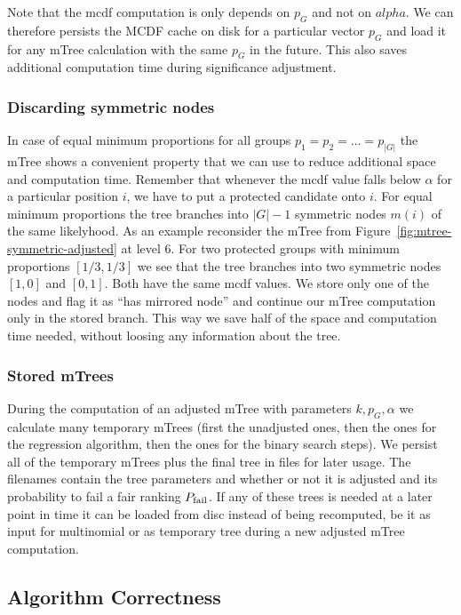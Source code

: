 Note that the mcdf computation is only depends on $p_G$ and not on $alpha$. 
%
We can therefore persists the MCDF cache on disk for a particular vector $p_G$ and load it for any mTree calculation with the same $p_G$ in the future.
%
This also saves additional computation time during significance adjustment.

\subsubsection{Discarding symmetric nodes}
\label{subsubsec:discarding-symmetric-nodes}
In case of equal minimum proportions for all groups $p_1 = p_2 = \ldots = p_|G|$ the mTree shows a convenient property that we can use to reduce additional space and computation time. 
%
Remember that whenever the mcdf value falls below $\alpha$ for a particular position $i$, we have to put a protected candidate onto $i$. 
%
For equal minimum proportions the tree branches into $|G| - 1$ symmetric nodes $m(i)$ of the same likelyhood.
%
As an example reconsider the mTree from Figure~\ref{fig:mtree-symmetric-adjusted} at level 6. 
%
For two protected groups with minimum proportions $[1/3, 1/3]$ we see that the tree branches into two symmetric nodes $[1, 0]$ and $[0,1]$. 
%
Both have the same mcdf values.
%
We store only one of the nodes and flag it as ``has mirrored node'' and continue our mTree computation only in the stored branch.
%
This way we save half of the space and computation time needed, without loosing any information about the tree. 

\subsubsection{Stored mTrees}
\label{subsubsec:stored-mtrees}
During the computation of an adjusted mTree with parameters $k,p_G , \alpha$ we calculate many temporary mTrees (first the unadjusted ones, then the ones for the regression algorithm, then the ones for the binary search steps).
%
We persist all of the temporary mTrees plus the final tree in files for later usage.
%
The filenames contain the tree parameters and whether or not it is adjusted and its probability to fail a fair ranking $P_{\operatorname{fail}}$.
%
If any of these trees is needed at a later point in time it can be loaded from disc instead of being recomputed, be it as input for multinomial \algoFAIR or as temporary tree during a new adjusted mTree computation.

\subsection{Algorithm Correctness}\label{subsec:algorithm-correctness}

